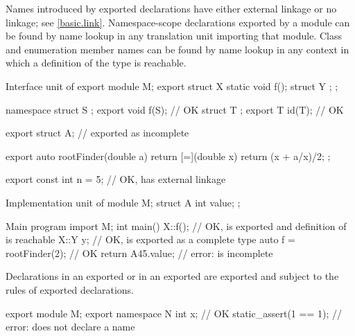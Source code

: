 \pnum
\begin{note}
Names introduced by exported declarations
have either external linkage or no linkage; see \ref{basic.link}.
Namespace-scope declarations exported by a module can be found by name lookup
in any translation unit importing that module.
Class and enumeration member names can be found by name lookup in any
context in which a definition of the type is reachable.
\end{note}
\begin{example}
\begin{codeblocktu}{Interface unit of }
export module M;
export struct X {
  static void f();
  struct Y { };
};

namespace {
  struct S { };
}
export void f(S);               // OK
struct T { };
export T id(T);                 // OK

export struct A;                //  exported as incomplete

export auto rootFinder(double a) {
  return [=](double x) { return (x + a/x)/2; };
}

export const int n = 5;         // OK,  has external linkage
\end{codeblocktu}

\begin{codeblocktu}{Implementation unit of }
module M;
struct A {
  int value;
};
\end{codeblocktu}

\begin{codeblocktu}{Main program}
import M;
int main() {
  X::f();                       // OK,  is exported and definition of  is reachable
  X::Y y;                       // OK,  is exported as a complete type
  auto f = rootFinder(2);       // OK
  return A{45}.value;           // error:  is incomplete
}
\end{codeblocktu}
\end{example}

\pnum
\begin{note}
Declarations in an exported 
or in an exported 
are exported and subject to the rules of exported declarations.
\begin{example}
\begin{codeblock}
export module M;
export namespace N {
  int x;                        // OK
  static_assert(1 == 1);        // error: does not declare a name
}
\end{codeblock}
\end{example}
\end{note}

